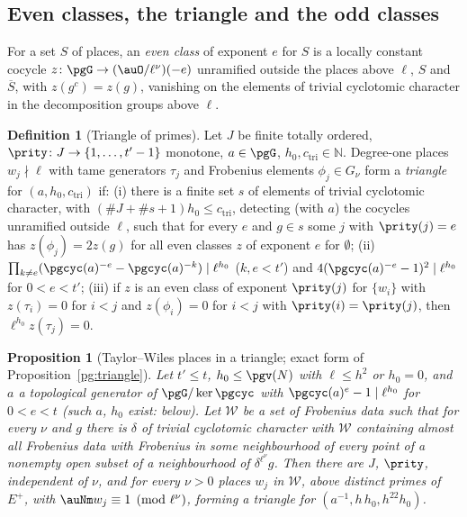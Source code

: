 \documentclass[10pt]{amsart}
\newtheorem{proposition}[theorem]{Proposition}
\theoremstyle{definition}
\newtheorem{definition}[theorem]{Definition}
\theoremstyle{remark}
\newcommand{\N}{\mathbb N}
\begin{document}
\subsection{Even classes, the triangle and the odd classes}\label{pri:ss-triangle}

For a set $S$ of places, an \emph{even class} of exponent $e$ for $S$ is a locally constant cocycle
$z\colon\pgG\to(\auO/\ell^\nu)(-e)$ unramified outside the places above $\ell$, $S$ and $\overline
S$, with $z(g^c)=z(g)$, vanishing on the elements of trivial cyclotomic character in the
decomposition groups above $\ell$.

\begin{definition}[Triangle of primes]\label{pri:def-tri}
Let $J$ be finite totally ordered, $\prity\colon J\to\{1,\dots,t'-1\}$ monotone, $a\in\pgG$, $h_0,
c_{\mathrm{tri}}\in\N$. Degree-one places $w_j\nmid\ell$ with tame generators $\tau_j$ and Frobenius elements
$\phi_j\in G_\nu$ form a \emph{triangle} for $(a,h_0,c_{\mathrm{tri}})$ if: (i) there is a finite set $s$ of
elements of trivial cyclotomic character, with $(\#J+\#s+1)h_0\le c_{\mathrm{tri}}$, detecting (with $a$) the
cocycles unramified outside $\ell$, such that for every $e$ and $g\in s$ some $j$ with $\prity(j)=e$
has $z(\phi_j)=2z(g)$ for all even classes $z$ of exponent $e$ for $\emptyset$; (ii) $\prod_{k\ne e}
(\pgcyc(a)^{-e}-\pgcyc(a)^{-k})\mid\ell^{h_0}$ ($k,e<t'$) and $4(\pgcyc(a)^{-e}-1)^2\mid\ell^{h_0}$
for $0<e<t'$; (iii) if $z$ is an even class of exponent $\prity(j)$ for $\{w_i\}$ with $z(\tau_i)=0$
for $i<j$ and $z(\phi_i)=0$ for $i<j$ with $\prity(i)=\prity(j)$, then $\ell^{h_0}z(\tau_j)=0$.
\end{definition}

\begin{proposition}[Taylor--Wiles places in a triangle; exact form of
Proposition~\ref{pg:triangle}]\label{pri:triangle}
Let $t'\le t$, $h_0\le\pgv(N)$ with $\ell\le h^2$ or $h_0=0$, and $a$ a topological generator of
$\pgG/\ker\pgcyc$ with $\pgcyc(a)^e-1\mid\ell^{h_0}$ for $0<e<t$ (such $a$, $h_0$ exist: below).
Let $\mathcal W$ be a set of Frobenius data such that for every $\nu$ and $g$ there is $\delta$ of
trivial cyclotomic character with $\mathcal W$ containing almost all Frobenius data with Frobenius in
some neighbourhood of every point of a nonempty open subset of a neighbourhood of $\delta^{\ell^\nu}
g$. Then there are $J$, $\prity$, independent of $\nu$, and for every $\nu>0$ places $w_j$ in
$\mathcal W$, above distinct primes of $E^+$, with $\auNm w_j\equiv1\pmod{\ell^\nu}$, forming a
triangle for $(a^{-1},h\,h_0,h^{22}h_0)$.
\end{proposition}
\end{document}

